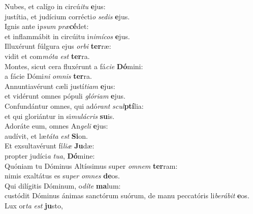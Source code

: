 \evenverse Nubes, et calígo in circú\textit{i}\textit{tu} \textbf{e}jus:~\*\\
\evenverse justítia, et judícium corrécti\textit{o} \textit{se}\textit{dis} \textbf{e}jus.\\
\oddverse Ignis ante i\textit{psum} \textit{præ}\textbf{cé}det:~\*\\
\oddverse et inflammábit in circúitu i\textit{ni}\textit{mí}\textit{cos} \textbf{e}jus.\\
\evenverse Illuxérunt fúlgura ejus \textit{or}\textit{bi} \textbf{ter}ræ:~\*\\
\evenverse vidit et com\textit{mó}\textit{ta} \textit{est} \textbf{ter}ra.\\
\oddverse Montes, sicut cera fluxérunt a fá\textit{ci}\textit{e} \textbf{Dó}mini:~\*\\
\oddverse a fácie Dómi\textit{ni} \textit{om}\textit{nis} \textbf{ter}ra.\\
\evenverse Annuntiavérunt cæli justí\textit{ti}\textit{am} \textbf{e}jus:~\*\\
\evenverse et vidérunt omnes pópuli \textit{gló}\textit{ri}\textit{am} \textbf{e}jus.\\
\oddverse Confundántur omnes, qui adó\textit{rant} \textit{scul}\textbf{ptí}lia:~\*\\
\oddverse et qui gloriántur in si\textit{mu}\textit{lá}\textit{cris} \textbf{su}is.\\
\evenverse Adoráte eum, omnes An\textit{ge}\textit{li} \textbf{e}jus:~\*\\
\evenverse audívit, et læ\textit{tá}\textit{ta} \textit{est} \textbf{Si}on.\\
\oddverse Et exsultavérunt fí\textit{li}\textit{æ} \textbf{Ju}dæ:~\*\\
\oddverse propter judíci\textit{a} \textit{tu}\textit{a}, \textbf{Dó}mine:\\
\evenverse Quóniam tu Dóminus Altíssimus super \textit{om}\textit{nem} \textbf{ter}ram:~\*\\
\evenverse nimis exaltátus es su\textit{per} \textit{om}\textit{nes} \textbf{de}os.\\
\oddverse Qui dilígitis Dóminum, o\textit{dí}\textit{te} \textbf{ma}lum:~\*\\
\oddverse custódit Dóminus ánimas sanctórum suórum, de manu peccatóris li\textit{be}\textit{rá}\textit{bit} \textbf{e}os.\\
\evenverse Lux or\textit{ta} \textit{est} \textbf{ju}sto,~\*\\
